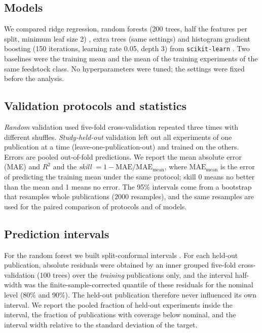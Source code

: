 \documentclass[11pt,a4paper]{article}
\begin{document}
\subsection{Models}
We compared ridge regression, random forests (200 trees, half the features per split, minimum leaf size 2) \cite{Breiman2001}, extra trees (same settings) \cite{Geurts2006} and histogram gradient boosting (150 iterations, learning rate 0.05, depth 3) from \texttt{scikit-learn} \cite{Pedregosa2011}. Two baselines were the training mean and the mean of the training experiments of the same feedstock class. No hyperparameters were tuned; the settings were fixed before the analysis.

\subsection{Validation protocols and statistics}
\emph{Random} validation used five-fold cross-validation repeated three times with different shuffles. \emph{Study-held-out} validation left out all experiments of one publication at a time (leave-one-publication-out) and trained on the others. Errors are pooled out-of-fold predictions. We report the mean absolute error (MAE) and $R^2$ and the \emph{skill} $=1-\mathrm{MAE}/\mathrm{MAE}_{\text{mean}}$, where $\mathrm{MAE}_{\text{mean}}$ is the error of predicting the training mean under the same protocol; skill 0 means no better than the mean and 1 means no error. The 95\% intervals come from a bootstrap that resamples whole publications ($2000$ resamples), and the same resamples are used for the paired comparison of protocols and of models.

\subsection{Prediction intervals}
For the random forest we built split-conformal intervals \cite{Lei2018,Angelopoulos2023}. For each held-out publication, absolute residuals were obtained by an inner grouped five-fold cross-validation (100 trees) over the \emph{training} publications only, and the interval half-width was the finite-sample-corrected quantile of these residuals for the nominal level (80\% and 90\%). The held-out publication therefore never influenced its own interval. We report the pooled fraction of held-out experiments inside the interval, the fraction of publications with coverage below nominal, and the interval width relative to the standard deviation of the target.
\end{document}
